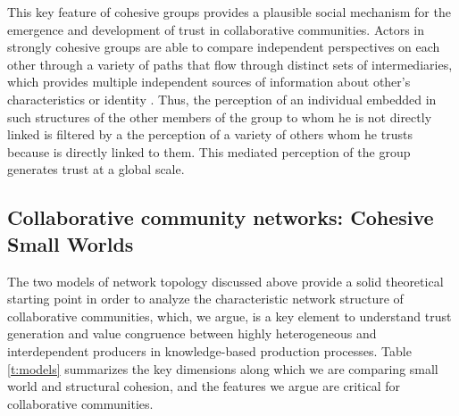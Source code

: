 This key feature of cohesive groups provides a plausible social mechanism for the emergence and development of trust in collaborative communities. Actors in strongly cohesive groups are able to compare independent perspectives on each other through a variety of paths that flow through distinct sets of intermediaries, which provides multiple independent sources of information about other's characteristics or identity \citep[320]{white:2001}. Thus, the perception of an individual embedded in such structures of the other members of the group to whom he is not directly linked is filtered by a the perception of a variety of others whom he trusts because is directly linked to them. This mediated perception of the group generates trust at a global scale.

\subsection{Collaborative community networks: Cohesive Small Worlds}

The two models of network topology discussed above provide a solid theoretical starting point in order to analyze the characteristic network structure of collaborative communities, which, we argue, is a key element to understand trust generation and value congruence between highly heterogeneous and interdependent producers in knowledge-based production processes. Table \ref{t:models} summarizes the key dimensions along which we are comparing small world and structural cohesion, and the features we argue are critical for collaborative communities.

